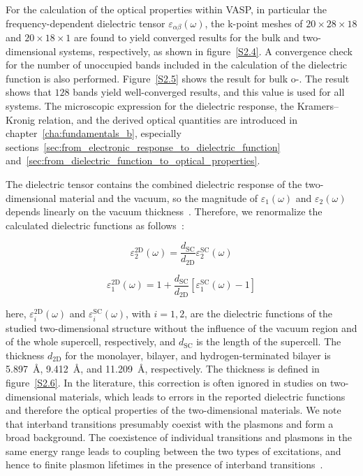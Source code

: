 For the calculation of the optical properties within VASP,
in particular the frequency-dependent dielectric tensor $\varepsilon_{\alpha\beta}(\omega)$,
the k-point meshes of $20 \times 28 \times 18$ and $20 \times 18 \times 1$ are found to yield converged results for the bulk and two-dimensional systems,
respectively, as shown in figure~\ref{S2.4}.
A convergence check for the number of unoccupied bands included in the calculation of the dielectric function is also performed.
Figure~\ref{S2.5} shows the result for bulk o-.
The result shows that $128$ bands yield well-converged results,
and this value is used for all systems.
The microscopic expression for the dielectric response,
the Kramers--Kronig relation,
and the derived optical quantities are introduced in chapter~\ref{cha:fundamentals_b},
especially sections~\ref{sec:from_electronic_response_to_dielectric_function} and~\ref{sec:from_dielectric_function_to_optical_properties}.

The dielectric tensor contains the combined dielectric response of the two-dimensional material and the vacuum,
so the magnitude of $\varepsilon_{1}(\omega)$ and $\varepsilon_{2}(\omega)$ depends linearly on the vacuum thickness~\cite{weng2018honeycomb,laturia2018dielectric}.
Therefore, we renormalize the calculated dielectric functions as follows~\cite{yang2021method}:

\begin{equation}
    \varepsilon_{2}^{\mathrm{2D}}(\omega)
    = \frac{d_{\mathrm{SC}}}{d_{\mathrm{2D}}}
    \varepsilon_{2}^{\mathrm{SC}}(\omega)
    \label{dielectric_vacuum_correction_imaginary}
\end{equation}

\begin{equation}
    \varepsilon_{1}^{\mathrm{2D}}(\omega) =
    1 + \frac{d_{\mathrm{SC}}}{d_{\mathrm{2D}}}
    \left[\varepsilon_{1}^{\mathrm{SC}}(\omega)-1\right]
    \label{dielectric_vacuum_correction_real}
\end{equation}

here, $\varepsilon_{i}^{\mathrm{2D}}(\omega)$ and $\varepsilon_{i}^{\mathrm{SC}}(\omega)$,
with $i=1,2$, are the dielectric functions of the studied two-dimensional structure without the influence of the vacuum region and of the whole supercell,
respectively, and $d_{\mathrm{SC}}$ is the length of the supercell.
The thickness $d_{\mathrm{2D}}$ for the monolayer, bilayer,
and hydrogen-terminated bilayer is \qty{5.897}{\angstrom},
\qty{9.412}{\angstrom}, and \qty{11.209}{\angstrom}, respectively.
The thickness is defined in figure~\ref{S2.6}.
In the literature, this correction is often ignored in studies on two-dimensional materials,
which leads to errors in the reported dielectric functions and therefore the optical properties of the two-dimensional materials.
We note that interband transitions presumably coexist with the plasmons and form a broad background.
The coexistence of individual transitions and plasmons in the same energy range leads to coupling between the two types of excitations,
and hence to finite plasmon lifetimes in the presence of interband transitions~\cite{li2017first}.

